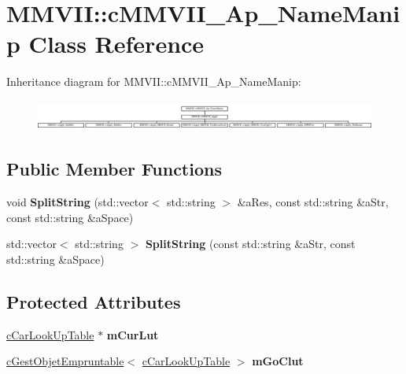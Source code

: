 \hypertarget{classMMVII_1_1cMMVII__Ap__NameManip}{}\section{M\+M\+V\+II\+:\+:c\+M\+M\+V\+I\+I\+\_\+\+Ap\+\_\+\+Name\+Manip Class Reference}
\label{classMMVII_1_1cMMVII__Ap__NameManip}
Inheritance diagram for M\+M\+V\+II\+:\+:c\+M\+M\+V\+I\+I\+\_\+\+Ap\+\_\+\+Name\+Manip\+:\begin{figure}[H]
\begin{center}
\leavevmode
\includegraphics[height=1.012658cm]{classMMVII_1_1cMMVII__Ap__NameManip}
\end{center}
\end{figure}
\subsection*{Public Member Functions}
\begin{DoxyCompactItemize}
\item 
void {\bfseries Split\+String} (std\+::vector$<$ std\+::string $>$ \&a\+Res, const std\+::string \&a\+Str, const std\+::string \&a\+Space)\hypertarget{classMMVII_1_1cMMVII__Ap__NameManip_a167f8aa96638ebaba83656e3f3734bdc}{}\label{classMMVII_1_1cMMVII__Ap__NameManip_a167f8aa96638ebaba83656e3f3734bdc}

\item 
std\+::vector$<$ std\+::string $>$ {\bfseries Split\+String} (const std\+::string \&a\+Str, const std\+::string \&a\+Space)\hypertarget{classMMVII_1_1cMMVII__Ap__NameManip_a5ff1e3d32f7dcd8a3ebfc1a15eaa81e8}{}\label{classMMVII_1_1cMMVII__Ap__NameManip_a5ff1e3d32f7dcd8a3ebfc1a15eaa81e8}

\end{DoxyCompactItemize}
\subsection*{Protected Attributes}
\begin{DoxyCompactItemize}
\item 
\hyperlink{classMMVII_1_1cCarLookUpTable}{c\+Car\+Look\+Up\+Table} $\ast$ {\bfseries m\+Cur\+Lut}\hypertarget{classMMVII_1_1cMMVII__Ap__NameManip_aebbf1ca7dc3fe928ad1c0fff0632b9ce}{}\label{classMMVII_1_1cMMVII__Ap__NameManip_aebbf1ca7dc3fe928ad1c0fff0632b9ce}

\item 
\hyperlink{classMMVII_1_1cGestObjetEmpruntable}{c\+Gest\+Objet\+Empruntable}$<$ \hyperlink{classMMVII_1_1cCarLookUpTable}{c\+Car\+Look\+Up\+Table} $>$ {\bfseries m\+Go\+Clut}\hypertarget{classMMVII_1_1cMMVII__Ap__NameManip_adde93d8691dd587d668c610eb6ad6e69}{}\label{classMMVII_1_1cMMVII__Ap__NameManip_adde93d8691dd587d668c610eb6ad6e69}

\end{DoxyCompactItemize}
